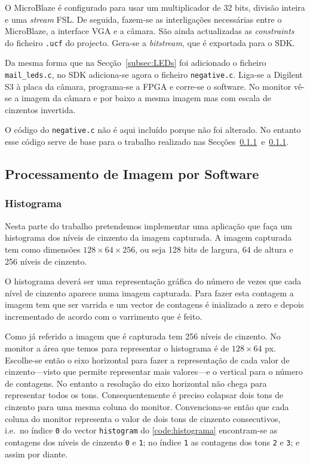\documentclass[a4paper,12pt]{article}
\begin{document}
O MicroBlaze é configurado para usar um multiplicador de 32 bits, divisão inteira e uma \textit{stream} FSL. De seguida, fazem-se as interligações necessárias entre o MicroBlaze, a interface VGA e a câmara. São ainda actualizadas as \textit{constraints} do ficheiro \texttt{.ucf} do projecto. Gera-se a \textit{bitstream}, que é exportada para o SDK.

Da mesma forma que na Secção~\ref{subsec:LEDs} foi adicionado o ficheiro \texttt{mail\_leds.c}, no SDK adiciona-se agora o ficheiro \texttt{negative.c}. Liga-se a Digilent S3 à placa da câmara, programa-se a FPGA e corre-se o software. No monitor vê-se a imagem da câmara e por baixo a mesma imagem mas com escala de cinzentos invertida.

O código do \texttt{negative.c} não é aqui incluído porque não foi alterado. No entanto esse código serve de base para o trabalho realizado nas Secções~\ref{subsec:histograma}~e~\ref{subsec:histograma}.

\subsection{Processamento de Imagem por Software}
\subsubsection{Histograma}
\label{subsec:histograma}

Nesta parte do trabalho pretendemos implementar uma aplicação que faça um histograma dos níveis de cinzento da imagem capturada. A imagem capturada tem como dimensões $128\times64\times256$, ou seja 128 bits de largura, 64 de altura e 256 níveis de cinzento.

O histograma deverá ser uma representação gráfica do número de vezes que cada nível de cinzento aparece numa imagem capturada. Para fazer esta contagem a imagem tem que ser varrida e um vector de contagens é inializado a zero e depois incrementado de acordo com o varrimento que é feito.

Como já referido a imagem que é capturada tem 256 níveis de cinzento. No monitor a área que temos para representar o histograma é de $128\times64$ px. Escolhe-se então o eixo horizontal para fazer a representação de cada valor de cinzento---visto que permite representar mais valores---e o vertical para o número de contagens. No entanto a resolução do eixo horizontal não chega para representar todos os tons. Consequentemente é preciso colapsar dois tons de cinzento para uma mesma coluna do monitor. Convenciona-se então que cada coluna do monitor representa o valor de dois tons de cinzento consecutivos, i.e.\ no índice \texttt{0} do vector \texttt{histogram} do \autoref{code:histograma} encontram-se as contagens dos níveis de cinzento \texttt{0} e \texttt{1}; no índice \texttt{1} as contagens dos tons \texttt{2} e \texttt{3}; e assim por diante.
\end{document}
